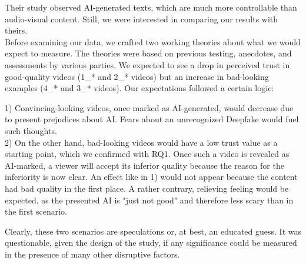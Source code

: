 \documentclass[
  a4paper,  %
  twoside,  %
  bibliography=totoc,
  headsepline,
  cleardoublepage=empty,
  parskip=half,
  draft=false
]{scrbook}
\begin{document}
Their study observed AI-generated texts, which are much more controllable than audio-visual content. Still, we were interested in comparing our results with theirs. \\
Before examining our data, we crafted two working theories about what we would expect to measure. The theories were based on previous testing, anecdotes, and assessments by various parties. We expected to see a drop in perceived trust in good-quality videos (1\_* and 2\_* videos) but an increase in bad-looking examples (4\_* and 3\_* videos). Our expectations followed a certain logic:

1) Convincing-looking videos, once marked as AI-generated, would decrease due to present prejudices about AI. Fears about an unrecognized Deepfake would fuel such thoughts. \\
2) On the other hand, bad-looking videos would have a low trust value as a starting point, which we confirmed with RQ1. Once such a video is revealed as AI-marked, a viewer will accept its inferior quality because the reason for the inferiority is now clear. An effect like in 1) would not appear because the content had bad quality in the first place. A rather contrary, relieving feeling would be expected, as the presented AI is "just not good" and therefore less scary than in the first scenario.

Clearly, these two scenarios are speculations or, at best, an educated guess. It was questionable, given the design of the study, if any significance could be measured in the presence of many other disruptive factors.
\end{document}
